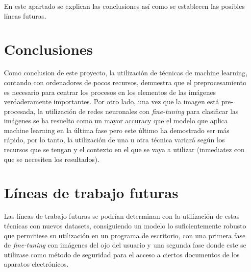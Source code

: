  \label{capitulo7}

En este apartado se explican las conclusiones así como se establecen las posibles líneas futuras.

\section{Conclusiones}
Como conclusion de este proyecto, la utilización de técnicas de machine learning, contando con ordenadores de pocos recursos, demuestra que el preprocesamiento
es necesario para centrar los procesos en los elementos de las imágenes verdaderamente importantes. Por otro lado, una vez que la imagen está pre-procesada, la utilización 
de redes neuronales con \textit{fine-tuning} para clasificar las imágenes se ha resuelto como un mayor accuracy que el modelo que aplica machine learning en la última fase
pero este último ha demostrado ser más rápido, por lo tanto, la utilización de una u otra técnica variará según los recursos que se tengan y el contexto en el que se 
vaya a utilizar (inmediatez con que se necesiten los resultados).


\section{Líneas de trabajo futuras}

Las líneas de trabajo futuras se podrían determinan con la utilización de estas técnicas con nuevos datasets, consiguiendo un modelo lo suficientemente robusto
que permitiese su utilización en un programa de escritorio, con una primera fase de \textit{fine-tuning} con imágenes del ojo del usuario y una segunda fase donde este 
se utilizase como método de seguridad para el acceso a ciertos documentos de los aparatos electrónicos.